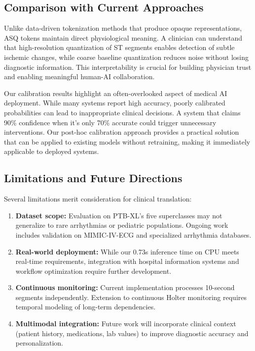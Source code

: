 \documentclass[journal]{IEEEtran}
\begin{document}
\subsection{Comparison with Current Approaches}

Unlike data-driven tokenization methods that produce opaque representations, ASQ tokens maintain direct physiological meaning. A clinician can understand that high-resolution quantization of ST segments enables detection of subtle ischemic changes, while coarse baseline quantization reduces noise without losing diagnostic information. This interpretability is crucial for building physician trust and enabling meaningful human-AI collaboration.

Our calibration results highlight an often-overlooked aspect of medical AI deployment. While many systems report high accuracy, poorly calibrated probabilities can lead to inappropriate clinical decisions. A system that claims 90\% confidence when it's only 70\% accurate could trigger unnecessary interventions. Our post-hoc calibration approach provides a practical solution that can be applied to existing models without retraining, making it immediately applicable to deployed systems.

\subsection{Limitations and Future Directions}

Several limitations merit consideration for clinical translation:

\begin{enumerate}
\item \textbf{Dataset scope:} Evaluation on PTB-XL's five superclasses may not generalize to rare arrhythmias or pediatric populations. Ongoing work includes validation on MIMIC-IV-ECG and specialized arrhythmia databases.

\item \textbf{Real-world deployment:} While our 0.73s inference time on CPU meets real-time requirements, integration with hospital information systems and workflow optimization require further development.

\item \textbf{Continuous monitoring:} Current implementation processes 10-second segments independently. Extension to continuous Holter monitoring requires temporal modeling of long-term dependencies.

\item \textbf{Multimodal integration:} Future work will incorporate clinical context (patient history, medications, lab values) to improve diagnostic accuracy and personalization.
\end{enumerate}
\end{document}
